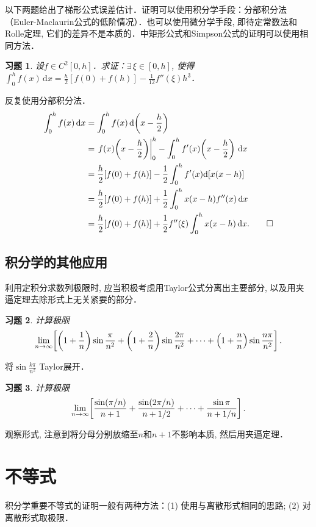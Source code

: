 \documentclass[11pt,a4paper]{ctexart}
\makeatletter
\theoremstyle{thmseries} %
\theoremstyle{exerseries}
\newtheorem{exer}{习题}[section]
\renewenvironment{proof}[1][\proofname]{\par
  \pushQED{\qed}%
  \normalfont \topsep6\p@\@plus6\p@\relax
  \trivlist
  \item[\hskip\labelsep
        \itshape
    #1\@addpunct{}]\ignorespaces
}{%
  \popQED\endtrivlist\@endpefalse
}
\newenvironment{sol}{\begin{proof}[\bfseries\upshape 解\quad]}{\end{proof}}
\newenvironment{pf}{\begin{proof}[\bfseries\upshape 证\quad]}{\end{proof}}
\newcommand{\bra}[1]{\mathopen{}\left(#1\right)}
\newcommand{\sbra}[1]{\mathopen{}\left[#1\right]}
\renewcommand{\d}{\mathrm{d}}
\def \nti {\mathnormal{n}\to\infty}
\makeatother
\begin{document}
以下两题给出了梯形公式误差估计．证明可以使用积分学手段：分部积分法（Euler-Maclaurin公式的低阶情况）．也可以使用微分学手段, 即待定常数法和Rolle定理, 它们的差异不是本质的．中矩形公式和Simpson公式的证明可以使用相同方法．
\begin{exer}
	设$f\in C^2[0,h]$．求证：$\exists\,\xi\in[0,h]$, 使得$\int_{0}^{h}f(x)\,\d x=\frac{h}{2}[f(0)+f(h)]-\frac{1}{12}f''(\xi)h^3$．
\end{exer}
\begin{pf}
	反复使用分部积分法．
	\begin{align*}
		\int_{0}^{h}f(x)\,\d x&=\int_{0}^{h}f(x)\,\d\bra{x-\frac{h}{2}}\\
		&=\left.f(x)\bra{x-\frac{h}{2}}\right|_0^h-\int_{0}^{h}f'(x)\bra{x-\frac{h}{2}}\,\d x\\
		&=\frac{h}{2}[f(0)+f(h)]-\frac{1}{2}\int_{0}^{h}f'(x)\d[x(x-h)]\\
		&=\frac{h}{2}[f(0)+f(h)]+\frac{1}{2}\int_{0}^{h}x(x-h)f''(x)\,\d x\\
		&=\frac{h}{2}[f(0)+f(h)]+\frac{1}{2}f''(\xi)\int_{0}^{h}x(x-h)\,\d x.\qedhere
	\end{align*}
\end{pf}


\subsection{积分学的其他应用}
利用定积分求数列极限时, 应当积极考虑用Taylor公式分离出主要部分, 以及用夹逼定理去除形式上无关紧要的部分．
\begin{exer}
	计算极限
	\[\lim_{\nti}\sbra{\bra{1+\frac{1}{n}}\sin\frac{\pi}{n^2}+\bra{1+\frac{2}{n}}\sin\frac{2\pi}{n^2}+\cdots+\bra{1+\frac{n}{n}}\sin\frac{n\pi}{n^2}}.\]
\end{exer}
\begin{sol}
	将$\sin\frac{k\pi}{n^2}$ Taylor展开．
\end{sol}

\begin{exer}
	计算极限
	\[\lim_{\nti}\sbra{\frac{\sin(\pi/n)}{n+1}+\frac{\sin(2\pi/n)}{n+1/2}+\cdots+\frac{\sin\pi}{n+1/n}}.\]
\end{exer}
\begin{sol}
	观察形式, 注意到将分母分别放缩至$n$和$n+1$不影响本质, 然后用夹逼定理．
\end{sol}


\section{不等式}
积分学重要不等式的证明一般有两种方法：(1) 使用与离散形式相同的思路; (2) 对离散形式取极限．
\end{document}
